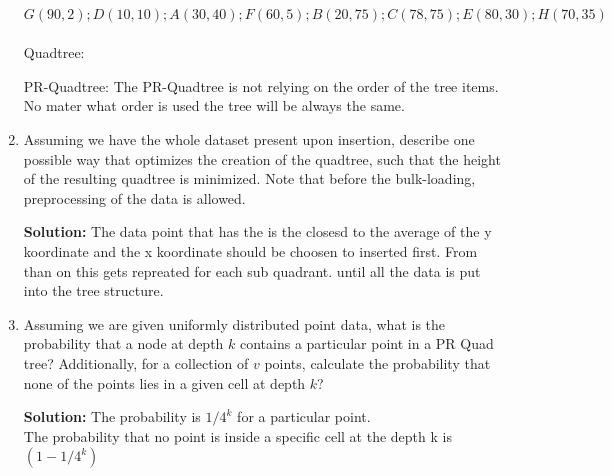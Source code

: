 \begin{enumerate}
  $G(90, 2); D(10,10); A(30,40); F(60, 5); B(20, 75); C(78,75); E(80, 30); H(70, 35)$\\\\
  Quadtree:\\

    PR-Quadtree:
    The PR-Quadtree is not relying on the order of the tree items. No mater what order is used the tree will be always the same. 
  
\item
Assuming we have the whole dataset present upon insertion, describe one possible way that optimizes the creation of the quadtree, such that the height of the resulting quadtree is minimized.
Note that before the bulk-loading, preprocessing of the data is allowed.

{\bf Solution: }
The data point that has the is the closesd to the average of the y koordinate and the x koordinate should be choosen to inserted first. From than on this gets repreated for each sub quadrant. until all the data is put into the tree structure.

\item
  Assuming we are given uniformly distributed point data, what is the probability that a node at depth $k$ contains a particular point in a PR Quad tree? 
  Additionally, for a collection of $v$ points, calculate the probability that none of the points lies in a given cell at depth $k$? 

{\bf Solution: }
The probability is $1/4^{k}$ for a particular point.\\
The probability that no point is inside a specific cell at the depth k is $(1-1/4^k)$

\end{enumerate}

